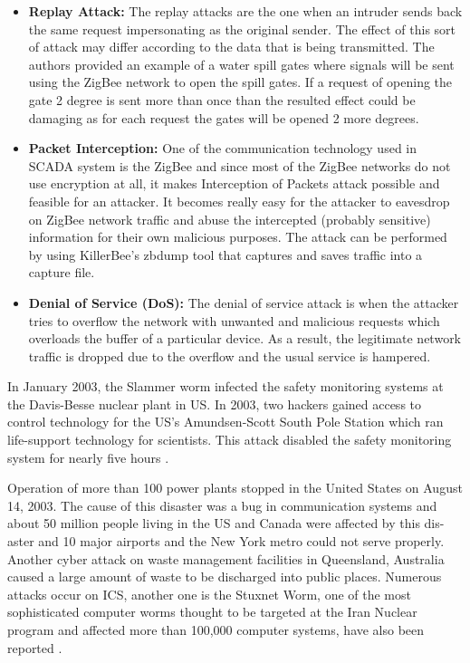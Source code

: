 \documentclass[letterpaper, 10 pt, conference]{ieeeconf}  %
\begin{document}
\begin{itemize}
\item \textbf{Replay Attack:} The replay attacks are the one when an intruder sends back the same request impersonating as the original sender. The effect of this sort of attack may differ according to the data that is being transmitted. The authors provided an example of a water spill gates where signals will be sent using the ZigBee network to open the spill gates. If a request of opening the gate 2 degree is sent more than once than the resulted effect could be damaging as for each request the gates will be opened 2 more degrees.
\item \textbf{Packet Interception: }
One of the communication technology used in SCADA system is the ZigBee and since most of the ZigBee networks do not use encryption at all, it makes Interception of Packets attack possible and feasible for an attacker. It becomes really easy for the attacker to eavesdrop on ZigBee network traffic and abuse the intercepted (probably sensitive) information for their own malicious purposes. The attack can be performed by using KillerBee’s zbdump tool that captures and saves traffic into a capture file.
\item \textbf{Denial of Service (DoS):} The denial of service attack is when the attacker tries to overflow the network with unwanted and malicious requests which overloads the buffer of a particular device. As a result, the legitimate network traffic is dropped due to the overflow and the usual service is hampered.
\end{itemize}
\par
In January 2003, the Slammer worm infected the safety monitoring systems at the Davis-Besse nuclear plant in US. In 2003, two hackers gained access to control technology for the US’s Amundsen-Scott South Pole Station which ran life-support technology for scientists. This attack disabled the safety monitoring system for nearly five hours \cite{c14}.
\par
Operation of more than 100 power plants stopped in the United States on August 14, 2003. The cause of this disaster was a bug in communication systems and about 50 million people living in the US and Canada were affected by this dis- aster and 10 major airports and the New York metro could not serve properly. Another cyber attack on waste management facilities in Queensland, Australia caused a large amount of waste to be discharged into public places. Numerous attacks occur on ICS, another one is the Stuxnet Worm, one of the most sophisticated computer worms thought to be targeted at the Iran Nuclear program and affected more than 100,000 computer systems, have also been reported \cite{c16}.
\end{document}
